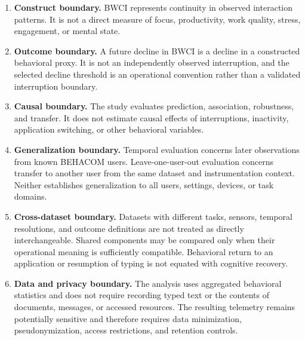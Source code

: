 \begin{enumerate}
    \item \textbf{Construct boundary.}
    BWCI represents continuity in observed interaction patterns. It is not a direct measure of focus, productivity, work quality, stress, engagement, or mental state.
    
    \item \textbf{Outcome boundary.}
    A future decline in BWCI is a decline in a constructed behavioral proxy. It is not an independently observed interruption, and the selected decline threshold is an operational convention rather than a validated interruption boundary.

    \item \textbf{Causal boundary.}
    The study evaluates prediction, association, robustness, and transfer. It does not estimate causal effects of interruptions, inactivity, application switching, or other behavioral variables.

    \item \textbf{Generalization boundary.}
    Temporal evaluation concerns later observations from known BEHACOM users. Leave-one-user-out evaluation concerns transfer to another user from the same dataset and instrumentation context. Neither establishes generalization to all users, settings, devices, or task domains.

    \item \textbf{Cross-dataset boundary.}
    Datasets with different tasks, sensors, temporal resolutions, and outcome definitions are not treated as directly interchangeable. Shared components may be compared only when their operational meaning is sufficiently compatible. Behavioral return to an application or resumption of typing is not equated with cognitive recovery.

    \item \textbf{Data and privacy boundary.}
     The analysis uses aggregated behavioral statistics and does not require recording typed text or the contents of documents, messages, or accessed resources. The resulting telemetry remains potentially sensitive and therefore requires data minimization, pseudonymization, access restrictions, and retention controls.
\end{enumerate}
